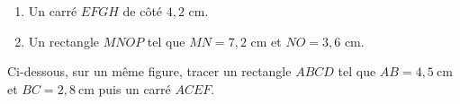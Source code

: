 \begin{enumerate}
	\item Un carré $EFGH$ de côté $4,2$ cm.
	\item Un rectangle $MNOP$ tel que $MN=7,2$ cm et $NO=3,6$ cm.	
\end{enumerate}

\vspace{8cm}

\exo{}

Ci-dessous, sur un même figure, tracer un rectangle $ABCD$ tel que $AB=4,5~\text{cm}$ et $BC=2,8~\text{cm}$ puis un carré $ACEF$.

\vspace{8cm}
$\phantom{X}$